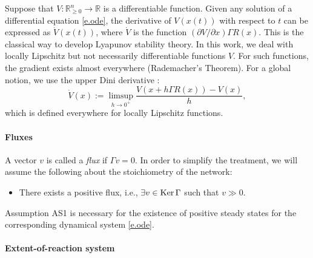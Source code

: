 \documentclass[onefignum,onetabnum]{siamonline220329}
\renewcommand{\ker}{{\mathop{\rm Ker\,}}}
\newcommand{\kerGamma}{\ker \Gamma}
\begin{document}
 
 
Suppose that $V:{\mathbb R}_{\ge0}^n \rightarrow {\mathbb R}$ is a differentiable function. Given any solution of a differential equation \eqref{e.ode}, the derivative of $V(x(t))$ with respect to $t$ can be expressed as $\dot V(x(t))$, where $\dot V$ is the function $(\partial V/\partial x) \Gamma R(x)$. This is the classical way to develop Lyapunov stability theory.  In this work,  we deal with locally Lipschitz but not necessarily differentiable functions $V$. For such functions, the gradient exists almost everywhere (Rademacher’s Theorem). For a global notion, we use the upper Dini derivative \cite{yoshizawa}: \begin{equation}\label{dini} \dot V(x):=\limsup_{h\to 0^+} \frac{V(x+h\Gamma R(x))-V(x)}h,\end{equation}  
which is defined everywhere for locally Lipschitz functions.
 
\paragraph{Fluxes}	A vector $v$ is called a \textit{flux} if $\Gamma v=0$.  In order to simplify the treatment, we will  assume the following about the stoichiometry of the network:
\begin{itemize}
\item[\textbf{AS1}:] 
There exists a positive flux, i.e.,  $\exists v \in \kerGamma$ such that $v\gg0$.  
\end{itemize}
Assumption AS1 is necessary for the existence of positive steady states for the corresponding dynamical system \eqref{e.ode}.

\paragraph{Extent-of-reaction system} 
 
\end{document}
